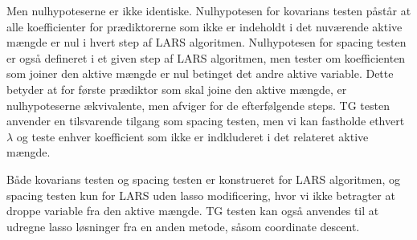 Men nulhypoteserne er ikke identiske.
Nulhypotesen for kovarians testen påstår at alle koefficienter for prædiktorerne som ikke er indeholdt i det nuværende aktive mængde er nul i hvert step af LARS algoritmen.
Nulhypotesen for spacing testen er også defineret i et given step af LARS algoritmen, men tester om koefficienten som joiner den aktive mængde er nul betinget det andre aktive variable.
Dette betyder at for første prædiktor som skal joine den aktive mængde, er nulhypoteserne ækvivalente, men afviger for de efterfølgende steps.
TG testen anvender en tilsvarende tilgang som spacing testen, men vi kan fastholde ethvert \(\lambda\) og teste enhver koefficient som ikke er indkluderet i det relateret aktive mængde.

Både kovarians testen og spacing testen er konstrueret for LARS algoritmen, og spacing testen kun for LARS uden lasso modificering, hvor vi ikke betragter at droppe variable fra den aktive mængde. TG testen kan også anvendes til at udregne lasso løsninger fra en anden metode, såsom coordinate descent.